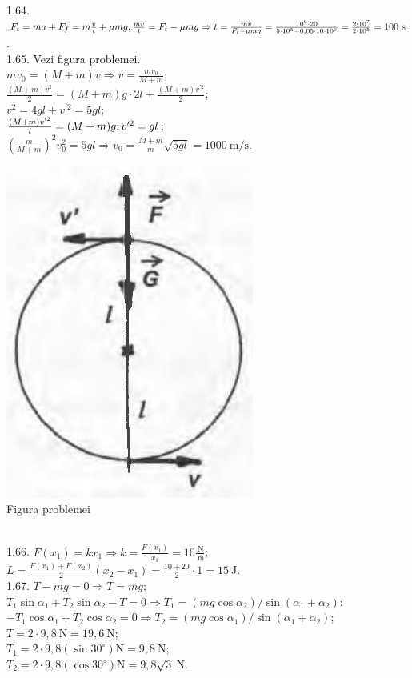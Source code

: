 1.64. $F_{t}=m a+F_{f}=m \frac{v}{t}+\mu m g;\\ \frac{m v}{t}=F_{t}-\mu m g \Rightarrow t=\frac{m v}{F_{t}-\mu m g}=\frac{10^{6} \cdot 20}{5 \cdot 10^{5}-0,05 \cdot 10 \cdot 10^{6}}=\frac{2 \cdot 10^{7}}{2 \cdot 10^{5}}=100 \mathrm{~s}$.\\

1.65. Vezi figura problemei.\\ $m v_{0}=(M+m) v \Rightarrow v=\frac{m v_{0}}{M+m}$;\\ $\frac{(M+m) v^{2}}{2}=(M+m) g \cdot 2 l+\frac{(M+m) v^{\prime 2}}{2}$;\\ $v^{2}=4 g l+v^{\prime 2}=5 g l$;\\ $\frac{(M+m) v^{\prime 2}}{l}=(M+m) g;\\ v^{\prime 2}=g l$;\\ $\left(\frac{m}{M+m}\right)^{2} v_{0}^{2}=5 g l \Rightarrow v_{0}=\frac{M+m}{m} \sqrt{5 g l}=1000 \mathrm{~m} / \mathrm{s}$.\\ \begin{center} \includegraphics[width=0.4\linewidth]{images/2025_07_01_5b3ff9fa0d508c8e9f17g-211(1)}\\ Figura problemei \end{center}\\

1.66. $F\left(x_{1}\right)=k x_{1} \Rightarrow k=\frac{F\left(x_{1}\right)}{x_{1}}=10 \frac{\mathrm{~N}}{\mathrm{~m}}$;\\ $L=\frac{F\left(x_{1}\right)+F\left(x_{2}\right)}{2}\left(x_{2}-x_{1}\right)=\frac{10+20}{2} \cdot 1=15 \mathrm{~J}$.\\

1.67. $T-m g=0 \Rightarrow T=m g$;\\ $T_{1} \sin \alpha_{1}+T_{2} \sin \alpha_{2}-T=0 \Rightarrow T_{1}=\left(m g \cos \alpha_{2}\right) / \sin \left(\alpha_{1}+\alpha_{2}\right)$;\\ $-T_{1} \cos \alpha_{1}+T_{2} \cos \alpha_{2}=0 \Rightarrow T_{2}=\left(m g \cos \alpha_{1}\right) / \sin \left(\alpha_{1}+\alpha_{2}\right)$;\\ $T=2 \cdot 9,8 \mathrm{~N}=19,6 \mathrm{~N}$;\\ $T_{1}=2 \cdot 9,8\left(\sin 30^{\circ}\right) \mathrm{N}=9,8 \mathrm{~N}$;\\ $T_{2}=2 \cdot 9,8\left(\cos 30^{\circ}\right) \mathrm{N}=9,8 \sqrt{3} \mathrm{~N}$.\\

